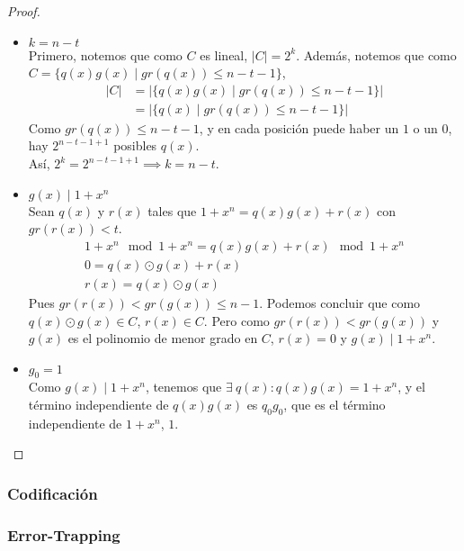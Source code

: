 \begin{proof}
\begin{itemize}
\begin{enumerate}
    \end{enumerate}
    \item $k = n - t$\\
    Primero, notemos que como $C$ es lineal, $\left| C \right| = 2^k$. Además, notemos que como $C = \{ q(x)g(x) \mid gr(q(x)) \le n - t - 1 \}$,
    \begin{align}
         \left| C \right|
         &= \left| \{ q(x)g(x) \mid gr(q(x)) \le n - t - 1 \} \right| \\
         &= \left| \{ q(x) \mid gr(q(x)) \le n - t - 1 \} \right|
    \end{align}
    Como $gr(q(x)) \le n - t - 1$, y en cada posición puede haber un $1$ o un $0$, hay $2^{n-t-1+1}$ posibles $q(x)$.\\
    Así, $2^k = 2^{n-t-1+1} \implies k = n-t$.
    \item $g(x) \mid 1+x^n$\\
    Sean $q(x)$ y $r(x)$ tales que $1+x^n = q(x)g(x)+r(x)$ con $gr(r(x)) < t$.
    \begin{align}
       1+x^n \mod{1+x^n} = q(x)g(x) + r(x) \mod{1+x^n}\\
       0 = q(x) \odot g(x) + r(x)\\
       r(x) = q(x) \odot g(x)
    \end{align}
    Pues $gr(r(x)) < gr(g(x)) \le n-1$. Podemos concluir que como $q(x) \odot g(x) \in C$, $r(x) \in C$. Pero como $gr(r(x)) < gr(g(x))$ y $g(x)$ es el polinomio de menor grado en $C$, $r(x) = 0$ y $g(x) \mid 1+x^n$.
    \item $g_0 = 1$\\
    Como $g(x) \mid 1+x^n$, tenemos que $\exists~ q(x) : q(x)g(x) = 1+x^n$, y el término independiente de $q(x)g(x)$ es $q_0g_0$, que es el término independiente de $1+x^n$, $1$.
    \end{itemize}
\end{proof}
\subsubsection{Codificación}
\subsubsection{Error-Trapping}